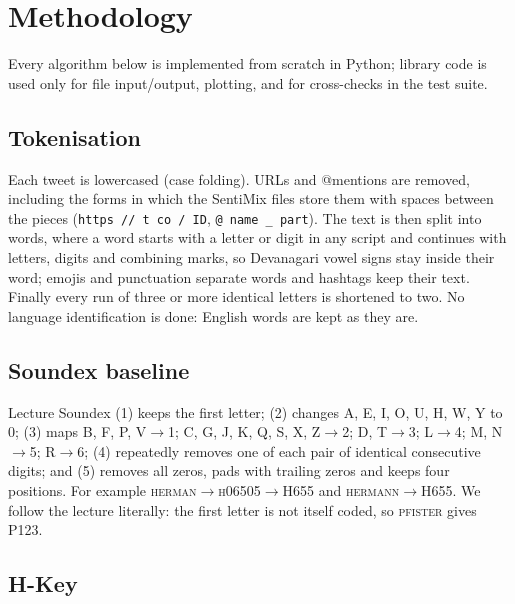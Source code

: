 
\section{Methodology}
\label{sec:methodology}

Every algorithm below is implemented from scratch in Python; library code is used only for file
input/output, plotting, and for cross-checks in the test suite.

\subsection{Tokenisation}
\label{sec:tokenisation}

Each tweet is lowercased (case folding). URLs and @mentions are removed, including the forms in
which the SentiMix files store them with spaces between the pieces (\texttt{https // t co / ID},
\texttt{@ name \_ part}). The text is then split into words, where a word starts with a letter or
digit in any script and continues with letters, digits and combining marks, so Devanagari vowel
signs stay inside their word; emojis and punctuation separate words and hashtags keep their text.
Finally every run of three or more identical letters is shortened to two. No language
identification is done: English words are kept as they are.

\subsection{Soundex baseline}

Lecture Soundex \citep[Section~3.4]{manning2008iir} (1) keeps the first letter; (2) changes
A, E, I, O, U, H, W, Y to 0; (3) maps B, F, P, V$\to$1; C, G, J, K, Q, S, X, Z$\to$2; D, T$\to$3;
L$\to$4; M, N$\to$5; R$\to$6; (4) repeatedly removes one of each pair of identical consecutive
digits; and (5) removes all zeros, pads with trailing zeros and keeps four positions. For example
\textsc{herman}$\to$\textsc{h}06505$\to$H655 and \textsc{hermann}$\to$H655. We follow the lecture
literally: the first letter is not itself coded, so \textsc{pfister} gives P123.

\subsection{H-Key}
\label{sec:hkey}

